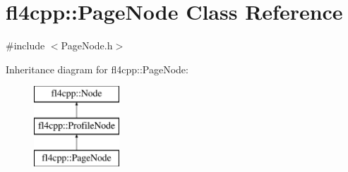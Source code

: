\hypertarget{classfl4cpp_1_1_page_node}{}\section{fl4cpp\+:\+:Page\+Node Class Reference}
\label{classfl4cpp_1_1_page_node}


{\ttfamily \#include $<$Page\+Node.\+h$>$}

Inheritance diagram for fl4cpp\+:\+:Page\+Node\+:\begin{figure}[H]
\begin{center}
\leavevmode
\includegraphics[height=3.000000cm]{classfl4cpp_1_1_page_node}
\end{center}
\end{figure}
